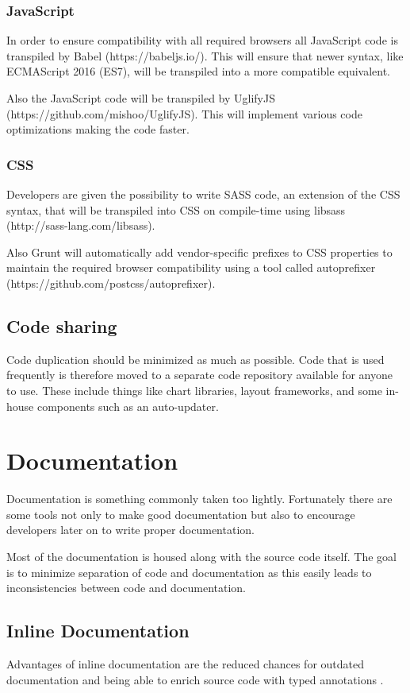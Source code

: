 \documentclass[journal]{IEEEtran}
\begin{document}
\subsubsection{JavaScript}
In order to ensure compatibility with all required browsers all JavaScript code
is transpiled by Babel (https://babeljs.io/). This will ensure that newer syntax,
like ECMAScript 2016 (ES7), will be transpiled into a more compatible equivalent.

Also the JavaScript code will be transpiled by UglifyJS
(https://github.com/mishoo/UglifyJS). This will implement various code
optimizations\cite{UglifyJSCompressor} making the code faster.
\subsubsection{CSS}
Developers are given the possibility to write SASS code, an extension of the CSS
syntax, that will be transpiled into CSS on compile-time using libsass
(http://sass-lang.com/libsass).

Also Grunt will automatically add vendor-specific prefixes to CSS properties to
maintain the required browser compatibility using a tool called autoprefixer
(https://github.com/postcss/autoprefixer).

\subsection{Code sharing}
Code duplication should be minimized as much as possible. Code that is used
frequently is therefore moved to a separate code repository available for
anyone to use. These include things like chart libraries, layout frameworks, and
some in-house components such as an auto-updater.

\section{Documentation}
Documentation is something commonly taken too lightly. Fortunately there are some
tools not only to make good documentation but also to encourage developers
later on to write proper documentation.

Most of the documentation is housed along with the source code itself. The goal
is to minimize separation of code and documentation as this easily leads to
inconsistencies between code and documentation.

\subsection{Inline Documentation}
Advantages of inline documentation are the reduced chances for outdated
documentation and being able to enrich source code with typed annotations
\cite{JS_Annotations}.
\end{document}
